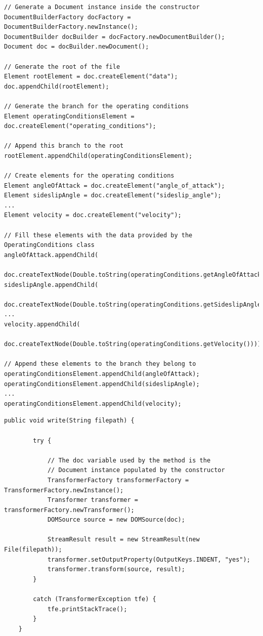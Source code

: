 \begin{lstlisting}[caption={\lstinline!DataWriter! class constructor}, captionpos=b, tabsize=2, label={lst:DataWriter01}]
// Generate a Document instance inside the constructor
DocumentBuilderFactory docFactory = DocumentBuilderFactory.newInstance();
DocumentBuilder docBuilder = docFactory.newDocumentBuilder();
Document doc = docBuilder.newDocument();

// Generate the root of the file
Element rootElement = doc.createElement("data");
doc.appendChild(rootElement);

// Generate the branch for the operating conditions
Element operatingConditionsElement = doc.createElement("operating_conditions");

// Append this branch to the root 
rootElement.appendChild(operatingConditionsElement);

// Create elements for the operating conditions
Element angleOfAttack = doc.createElement("angle_of_attack");
Element sideslipAngle = doc.createElement("sideslip_angle");
...
Element velocity = doc.createElement("velocity");

// Fill these elements with the data provided by the OperatingConditions class
angleOfAttack.appendChild(
	doc.createTextNode(Double.toString(operatingConditions.getAngleOfAttack())));
sideslipAngle.appendChild(
	doc.createTextNode(Double.toString(operatingConditions.getSideslipAngle())));
...
velocity.appendChild(
	doc.createTextNode(Double.toString(operatingConditions.getVelocity())));
	
// Append these elements to the branch they belong to
operatingConditionsElement.appendChild(angleOfAttack);
operatingConditionsElement.appendChild(sideslipAngle);
...
operatingConditionsElement.appendChild(velocity);
\end{lstlisting}
% 
\bigskip
\begin{lstlisting}[caption={\lstinline!DataWriter! class \lstinline!write! method}, captionpos=b, tabsize=2, label={lst:DataWriter02}]
public void write(String filepath) {
		
		try {
		
			// The doc variable used by the method is the 
			// Document instance populated by the constructor
			TransformerFactory transformerFactory = TransformerFactory.newInstance();
			Transformer transformer = transformerFactory.newTransformer();
			DOMSource source = new DOMSource(doc);
			
			StreamResult result = new StreamResult(new File(filepath));			
			transformer.setOutputProperty(OutputKeys.INDENT, "yes");
			transformer.transform(source, result);
		}
		
		catch (TransformerException tfe) {
			tfe.printStackTrace();
		}
	}
\end{lstlisting}
%


